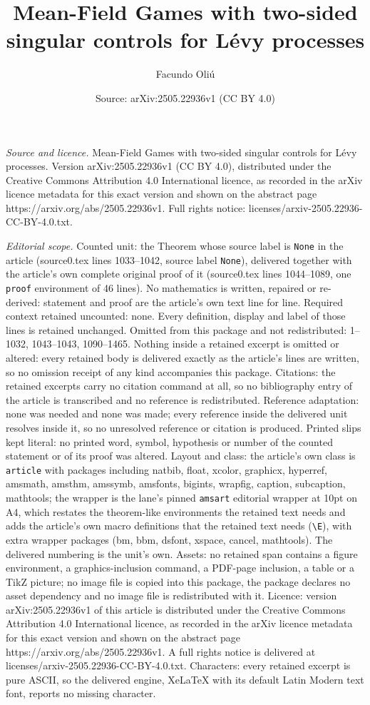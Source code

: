 \documentclass[10pt,a4paper]{amsart}
\title[Mean-Field Games with two-sided singular controls for L\'evy]{Mean-Field Games with two-sided singular controls for L\'evy processes}
\author{Facundo Oli\'u}
\date{Source: arXiv:2505.22936v1 (CC BY 4.0)}
\begin{document}
\maketitle

\noindent\emph{Source and licence.} Mean-Field Games with two-sided singular controls for L\'evy processes. Version arXiv:2505.22936v1 (CC BY 4.0), distributed under the Creative Commons Attribution 4.0 International licence, as recorded in the arXiv licence metadata for this exact version and shown on the abstract page https://arxiv.org/abs/2505.22936v1. Full rights notice: licenses/arxiv-2505.22936-CC-BY-4.0.txt.\par\smallskip

\noindent\textit{Editorial scope.} Counted unit: the Theorem whose source label is \texttt{None} in the article (source0.tex lines 1033--1042, source label \texttt{None}), delivered together with the article's own complete original proof of it (source0.tex lines 1044--1089, one \texttt{proof} environment of 46 lines). No mathematics is written, repaired or re-derived: statement and proof are the article's own text line for line. Required context retained uncounted: none. Every definition, display and label of those lines is retained unchanged. Omitted from this package and not redistributed: 1--1032, 1043--1043, 1090--1465. Nothing inside a retained excerpt is omitted or altered: every retained body is delivered exactly as the article's lines are written, so no omission receipt of any kind accompanies this package. Citations: the retained excerpts carry no citation command at all, so no bibliography entry of the article is transcribed and no reference is redistributed. Reference adaptation: none was needed and none was made; every reference inside the delivered unit resolves inside it, so no unresolved reference or citation is produced. Printed slips kept literal: no printed word, symbol, hypothesis or number of the counted statement or of its proof was altered. Layout and class: the article's own class is \texttt{article} with packages including natbib, float, xcolor, graphicx, hyperref, amsmath, amsthm, amssymb, amsfonts, bigints, wrapfig, caption, subcaption, mathtools; the wrapper is the lane's pinned \texttt{amsart} editorial wrapper at 10pt on A4, which restates the theorem-like environments the retained text needs and adds the article's own macro definitions that the retained text needs (\texttt{\textbackslash E}), with extra wrapper packages (bm, bbm, dsfont, xspace, cancel, mathtools). The delivered numbering is the unit's own. Assets: no retained span contains a figure environment, a graphics-inclusion command, a PDF-page inclusion, a table or a TikZ picture; no image file is copied into this package, the package declares no asset dependency and no image file is redistributed with it. Licence: version arXiv:2505.22936v1 of this article is distributed under the Creative Commons Attribution 4.0 International licence, as recorded in the arXiv licence metadata for this exact version and shown on the abstract page https://arxiv.org/abs/2505.22936v1. A full rights notice is delivered at licenses/arxiv-2505.22936-CC-BY-4.0.txt. Characters: every retained excerpt is pure ASCII, so the delivered engine, XeLaTeX with its default Latin Modern text font, reports no missing character.
\end{document}
